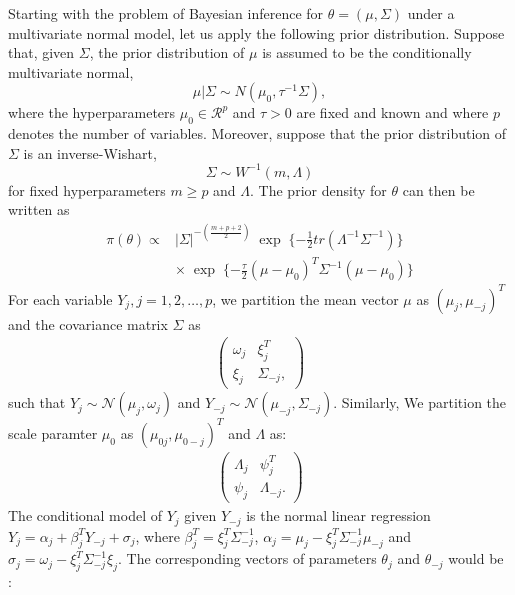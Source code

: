 \documentclass[12pt, fullpage, a4paper]{article}
\begin{document}
Starting with the problem of Bayesian inference for $\theta = (\mu, \Sigma)$ under a multivariate normal model, let us apply the following prior distribution. Suppose that, given $\Sigma$, the prior distribution of $\mu$ is assumed to be the conditionally multivariate normal,
\begin{equation}
\mu | \Sigma \sim N(\mu_{0}, \tau^{-1}\Sigma),
\end{equation}
where the hyperparameters $\mu_{0} \in \mathcal{R}^{p}$ and $\tau > 0$ are fixed and known and where $p$ denotes the number of variables. Moreover, suppose that the prior distribution of $\Sigma$ is an inverse-Wishart,
\begin{equation}
\Sigma \sim W^{-1}(m, \Lambda)
\end{equation}
for fixed hyperparameters $m \ge p$ and $\Lambda$. The prior density for $\theta$ can then be written as
\begin{equation}
\begin{array}{ll}
\pi(\theta) \propto &|\Sigma|^{-(\frac{m+p+2}{2})}\;\exp\;\{-\frac{1}{2}tr(\Lambda^{-1}\Sigma^{-1})\}\\
& \times\;\exp\;\{-\frac{\tau}{2}(\mu-\mu_{0})^{T}\Sigma^{-1}(\mu-\mu_{0})\}
\end{array}	
\end{equation}
For each variable $Y_{j}, j = 1, 2, \dots, p$, we partition the mean vector $\mu$ as $(\mu_j, \mu_{-j})^T$ and the covariance matrix $\Sigma$ as 
\begin{eqnarray*}
	\left(\begin{array}{cc}
		\omega_{j} & \xi_{j}^T\\
		\xi_{j} & \Sigma_{-j}, 
	\end{array}\right)
\end{eqnarray*}
such that $Y_j \sim \mathcal{N}(\mu_j, \omega_{j})$ and $Y_{-j} \sim \mathcal{N}(\mu_{-j}, \Sigma_{-j})$. Similarly, We partition the scale paramter $\mu_{0}$ as $(\mu_{0j}, \mu_{0-j})^T$ and $\Lambda$ as:
\begin{eqnarray*}
	\left(\begin{array}{cc}
		\Lambda_{j} & \psi_{j}^T\\
		\psi_{j} & \Lambda_{-j}. 
	\end{array}\right)
\end{eqnarray*}
The conditional model of $Y_j$ given $Y_{-j}$ is the normal linear regression $Y_{j} = \alpha_j + \beta_{j}^TY_{-j} + \sigma_{j}$, where $\beta_{j}^T = \xi_{j}^T\Sigma_{-j}^{-1}$, $\alpha_j = \mu_j - \xi_{j}^T\Sigma_{-j}^{-1}\mu_{-j}$ and $\sigma_{j} = \omega_{j} - \xi_{j}^T\Sigma_{-j}^{-1}\xi_{j}$. The corresponding vectors of parameters $\theta_{j}$ and $\theta_{-j}$ would be : 
\end{document}
